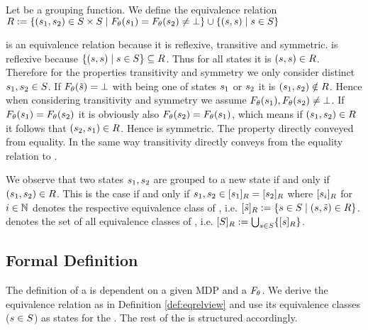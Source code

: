 \documentclass[preview]{standalone}
\begin{document}
\begin{definition}
	Let \grpfct be a grouping function. We define the equivalence relation ${R} :=\{ ({s}_1, {s}_2) \in {S} \times {S} \mid {F_{\ensuremath{{\theta}}}}({s}_1) = {F_{{\theta}}}({s}_2) \neq \bot\} \cup \{({s}, {s})  \mid {s} \in {S}\}$
	
	\label{def:eqrelview}
\end{definition}

\eqrelview is an equivalence relation because it is reflexive, transitive and symmetric. \eqrelview is reflexive because $\{({s}, {s})  \mid {s} \in {S}\} \subseteq {R}$. Thus for all states \state it is $({s}, {s}) \in {R}$. Therefore for the properties transitivity and symmetry we only consider distinct ${s}_1, {s}_2 \in {S}$. If ${F_{{\theta}}}({\tilde{{s}}}) = {\bot}$ with \smstate being one of states ${s}_1$ or ${s}_2$ it is $({s}_1, {s}_2) \notin {R}$. Hence when considering transitivity and symmetry we assume ${F_{{\theta}}}({s}_1), {F_{{\theta}}}({s}_2) \neq {\bot}$. If ${F_{{\theta}}}({s}_1) = {F_{{\theta}}}({s}_2)$ it is obviously also ${F_{{\theta}}}({s}_2) = {F_{{\theta}}}({s}_1)$, which means if $({s}_1, {s}_2) \in {R}$ it follows that $({s}_2, {s}_1) \in {R}$. Hence \eqrelview is symmetric. The property directly conveyed from equality. In the same way transitivity directly conveys from the equality relation to \eqrelview.

We observe that two states ${s}_1, {s}_2$ are grouped to a new state if and only if $({s}_1, {s}_2) \in {R}$. This is the case if and only if ${s}_1, {s}_2 \in {\ensuremath{{[{s}_1]_{{R}}}}} = {{[{s}_2]_{{R}}}}$ where ${{[{s}_i]_{{R}}}}$ for $i \in {\mathbb{N}}$ denotes the respective equivalence class of \eqrelview, i.e. ${{[{\tilde{{s}}}]_{{R}}}} := \{{s} \in {S} \mid ({s},{\tilde{{s}}}) \in {R}\}$. \eqclasssetv denotes the set of all equivalence classes of \eqrelview, i.e. ${{[{{S}}]_{{R}}}} := \bigcup_{{s} \in {S}}\{{{[{s}]_{{R}}}}\}$.

\subsection{Formal Definition}

The definition of a \viewN is dependent on a given MDP and a \grpfctN ${F_{{\theta}}}$. We derive the equivalence relation \eqrelview as in Definition \ref{def:eqrelview} and use its equivalence classes \eqclassv (${s} \in {S}$) as states for the \viewN. The rest of the \chosengraphtypeN is structured accordingly.
\end{document}
